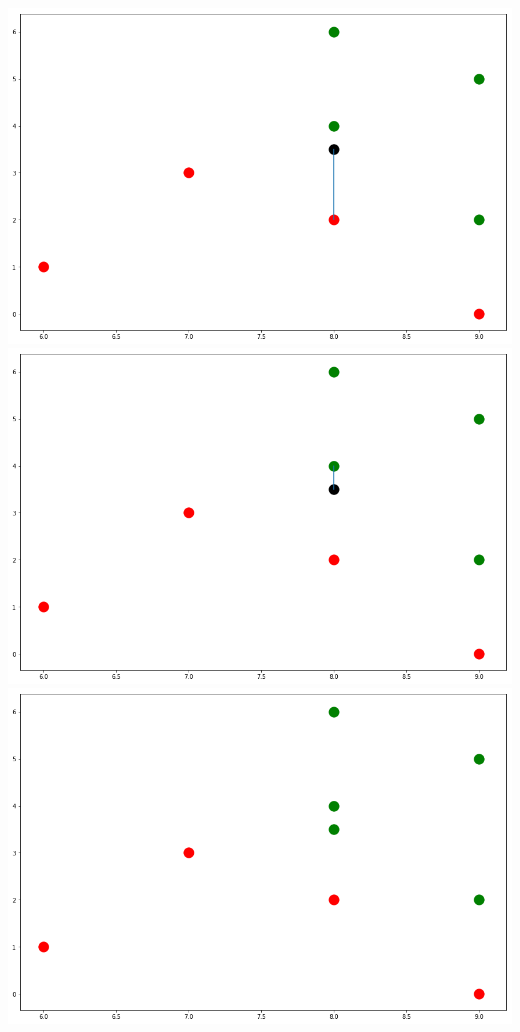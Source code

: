 \documentclass[a4paper]{scrartcl}
\begin{document}
\begin{multicols}{2}
                        \includegraphics[width=\linewidth]{nn4.png}
                        \includegraphics[width=\linewidth]{nn5.png}
                        \includegraphics[width=\linewidth]{nn6.png}
                        

\end{multicols}
\end{document}

